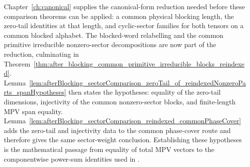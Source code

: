 \begin{remark}
	Chapter~\ref{ch:canonical} supplies the canonical-form reduction needed before
	these comparison theorems can be applied: a common physical blocking length,
	the zero-tail identities at that length, and cyclic-sector families for both
	tensors on a common blocked alphabet.  The blocked-word relabelling and the
	common primitive irreducible nonzero-sector decompositions are now part of the
	reduction, culminating in
	Theorem~\ref{thm:after_blocking_common_primitive_irreducible_blocks_reindexed}.
	Lemma~\ref{lem:afterBlocking_sectorComparison_zeroTail_of_reindexedNonzeroParts_spanHypotheses}
		then states the hypotheses: equality of the
	zero-tail dimensions, injectivity of the common nonzero-sector blocks, and
	finite-length MPV span equality.
	Lemma~\ref{lem:afterBlocking_sectorComparison_reindexed_commonPhaseCover}
	adds the zero-tail and injectivity data to the common phase-cover route and
	therefore gives the same sector-weight conclusion.  Establishing these
	hypotheses is the mathematical passage from equality of total MPV vectors to the
	componentwise power-sum identities used in
	\cite[Corollary~IV.5]{Cirac2021Matrix}.
\end{remark}
